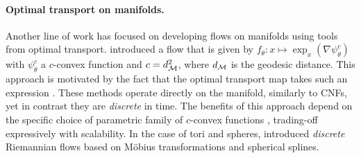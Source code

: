 \paragraph{Optimal transport on manifolds.}
Another line of work has focused on developing flows on manifolds 
using tools from optimal transport. %
\cite{sei2013jacobian} introduced a flow that is given by $f_\theta: x \mapsto \exp_x(\nabla \psi^c_\theta)$ 
with $\psi^c_\theta$ a $c$-convex function and $c=d^2_\mathcal M$, where $d_\mathcal M$ is the
geodesic distance.  This approach is motivated by the fact that the
optimal transport map takes such an expression
\citep{ambrosio2003Optimal}.  These methods operate directly on the manifold,
similarly to CNFs, yet in contrast they are \emph{discrete} in time.  The
benefits of this approach depend on the specific choice of parametric family of
$c$-convex functions \citep{rezende2021Implicit,cohen2021riemannian},
trading-off expressively with scalability.
In the case of tori and spheres, \cite{rezende2020Normalizing} introduced \emph{discrete} Riemannian ﬂows based on Möbius transformations and spherical splines.




